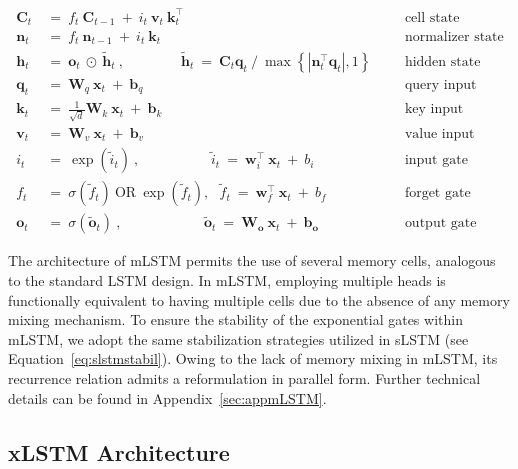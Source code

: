 \begin{align}
\label{eq:mlstm_recurrent_begin}
\mathbf{C}_t \ &= \  f_t \ \mathbf{C}_{t-1} \ + \ 
  i_t \ \mathbf{v}_t \ \mathbf{k}_t^\top & &  &\text{cell state} \\
\mathbf{n}_t \ &= \  f_t \ \mathbf{n}_{t-1} \ + \ 
  i_t \ \mathbf{k}_t & &  &\text{normalizer state} \\
\mathbf{h}_t  \ &= \ \mathbf{o}_t \ \odot \ \tilde{\mathbf{h}}_t
\ , \qquad \qquad 
\tilde{\mathbf{h}}_t \ = \   \mathbf{C}_t \mathbf{q}_t \ / \ 
  \max \left\{ |\mathbf{n}_t^\top \mathbf{q}_t|, 1 \right\} 
   &&&\text{hidden state} \\
\mathbf{q}_t \ &= \ \mathbf{W}_q \ \mathbf{x}_t \ + \ \mathbf{b}_q  & &  &\text{query input} \\
\mathbf{k}_t \ &= \ \frac{1}{\sqrt{d}} \mathbf{W}_k \ \mathbf{x}_t \ + \ \mathbf{b}_k  & &  &\text{key input} \\
\mathbf{v}_t \ &= \ \mathbf{W}_v \ \mathbf{x}_t \ + \ \mathbf{b}_v  & &  &\text{value input} \\
i_t \ &= \ \!\exp \!  \! \left( \tilde{i}_t  \right) \ , 
 \qquad \qquad \ \ \ \ \,
  \tilde{i}_t \ = \ \mathbf{w}^\top_{i} \ \mathbf{x}_t \ + \  b_{i} \ \ \ 
  &&&\text{input gate} \\
f_t \ &= \ \sigma \!  \left(  \tilde{f}_t \right) \ \text{OR} \ \!\exp \!  \! \left(  \tilde{f}_t \right) , \ \ \: \!
\tilde{f}_t \ = \ \mathbf{w}^\top_{f} \ \mathbf{x}_t  \ + \
  b_{f}
  &&& \text{forget gate} \\
\label{eq:mlstm_recurrent_end}
\mathbf{o}_t \ &= \ \sigma \left( \tilde{\mathbf{o}}_t \right) \ , \qquad \qquad \quad \ \ \ \,
  \tilde{\mathbf{o}}_t  \ = \ \mathbf{W}_{\mathbf{o}} \ \mathbf{x}_t \ + \
  \mathbf{b}_{\mathbf{o}}
  &&&\text{output gate} 
\end{align}

The architecture of mLSTM permits the use of several memory cells, analogous to the standard LSTM design. In mLSTM, employing multiple heads is functionally equivalent to having multiple cells due to the absence of any memory mixing mechanism. To ensure the stability of the exponential gates within mLSTM, we adopt the same stabilization strategies utilized in sLSTM (see Equation~\ref{eq:slstmstabil}). Owing to the lack of memory mixing in mLSTM, its recurrence relation admits a reformulation in parallel form. Further technical details can be found in Appendix~\ref{sec:appmLSTM}.

\subsection{xLSTM Architecture}
\label{sec:xLSTMarch}

